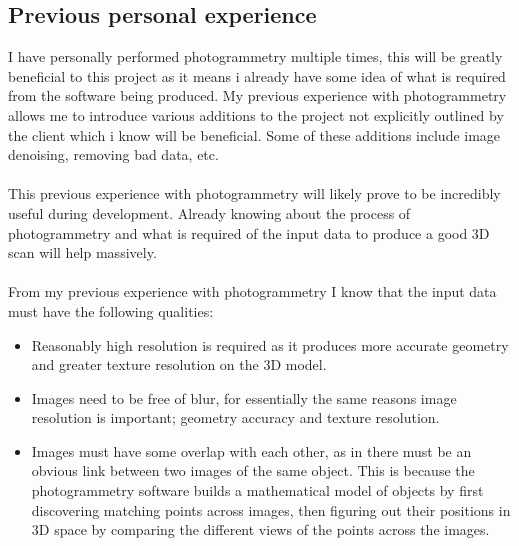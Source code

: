 \documentclass[11pt]{report}
\begin{document}
\subsection{Previous personal experience}
I have personally performed photogrammetry multiple times, this will be greatly beneficial to this project as it means i already have some idea of what is required from the software being produced. My previous experience with photogrammetry allows me to introduce various additions to the project not explicitly outlined by the client which i know will be beneficial. Some of these additions include image denoising, removing bad data, etc.\\\\
This previous experience with photogrammetry will likely prove to be incredibly useful during development. Already knowing about the process of photogrammetry and what is required of the input data to produce a good 3D scan will help massively.\\\\
From my previous experience with photogrammetry I know that the input data must have the following qualities:
\begin{itemize}
\item Reasonably high resolution is required as it produces more accurate geometry and greater texture resolution on the 3D model.
\item Images need to be free of blur, for essentially the same reasons image resolution is important; geometry accuracy and texture resolution.
\item Images must have some overlap with each other, as in there must be an obvious link between two images of the same object. This is because the photogrammetry software builds a mathematical model of objects by first discovering matching points across images, then figuring out their positions in 3D space by comparing the different views of the points across the images.
\end{itemize}
\end{document}
